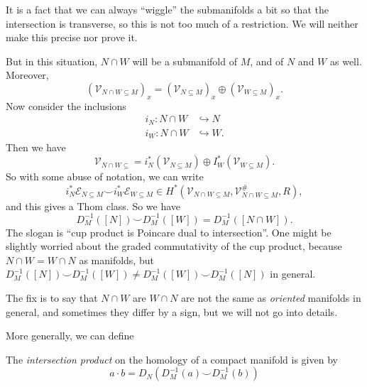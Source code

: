 \documentclass[a4paper]{article}
\begin{document}
It is a fact that we can always ``wiggle'' the submanifolds a bit so that the intersection is transverse, so this is not too much of a restriction. We will neither make this precise nor prove it.

But in this situation, $N \cap W$ will be a submanifold of $M$, and of $N$ and $W$ as well. Moreover,
\[
  (\mathcal{V}_{N \cap W \subseteq M})_x = (\mathcal{V}_{N \subseteq M})_x \oplus (\mathcal{V}_{W \subseteq M})_x.
\]
Now consider the inclusions
\begin{align*}
  i_N: N \cap W &\hookrightarrow N\\
  i_W: N \cap W &\hookrightarrow W.
\end{align*}
Then we have
\[
  \mathcal{V}_{N \cap W \subseteq} = i_N^* (\mathcal{V}_{N \subseteq M}) \oplus I_W^*(\mathcal{V}_{W \subseteq M}).
\]
So with some abuse of notation, we can write
\[
  i_N^* \mathcal{E}_{N \subseteq M} \smile i_W^* \mathcal{E}_{W \subseteq M} \in H^*(\mathcal{V}_{N \cap W \subseteq M}, \mathcal{V}_{N \cap W \subseteq M}^\#, R),
\]
and this gives a Thom class. So we have
\[
  D_M^{-1}([N]) \smile D_M^{-1}([W]) = D_M^{-1}([N \cap W]).
\]
The slogan is ``cup product is Poincare dual to intersection''. One might be slightly worried about the graded commutativity of the cup product, because $N \cap W = W \cap N$ as manifolds, but $D_M^{-1}([N]) \smile D_M^{-1}([W]) \not= D_M^{-1}([W]) \smile D_M^{-1}([N])$ in general.

The fix is to say that $N \cap W$ are $W \cap N$ are not the same as \emph{oriented} manifolds in general, and sometimes they differ by a sign, but we will not go into details.

More generally, we can define
\begin{defi}
  The \emph{intersection product} on the homology of a compact manifold is given by
  \[
    a \cdot b = D_N(D_M^{-1}(a) \smile D_M^{-1}(b))
  \]
\end{defi}
\end{document}
